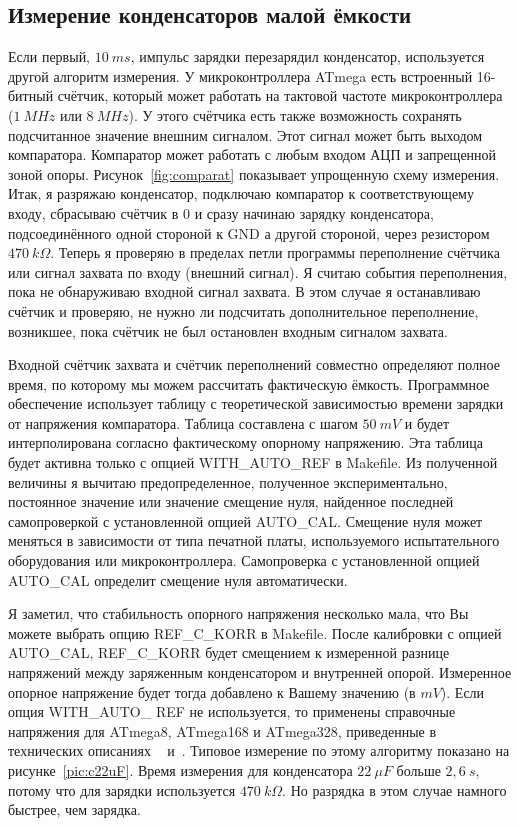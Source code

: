 \subsection{Измерение конденсаторов малой ёмкости}
Если первый, \(10~ms\), импульс зарядки перезарядил конденсатор, используется другой алгоритм измерения. У 
микроконтроллера ATmega есть встроенный 16-битный счётчик, который может работать на тактовой частоте 
микроконтроллера (\(1~MHz\) или \(8~MHz\)). У этого счётчика есть также возможность сохранять подсчитанное значение 
внешним сигналом. Этот сигнал может быть выходом компаратора. Компаратор может работать с любым входом АЦП и 
запрещенной зоной опоры. Рисунок~\ref{fig:comparat} показывает упрощенную схему измерения. Итак, я разряжаю 
конденсатор, подключаю компаратор к соответствующему входу, сбрасываю счётчик в 0 и сразу начинаю зарядку 
конденсатора, подсоединённого одной стороной к GND а другой стороной, через резистором \(470~k\Omega\). 
Теперь я проверяю в пределах петли программы переполнение счётчика или сигнал захвата по входу (внешний сигнал). 
Я считаю события переполнения, пока не обнаруживаю входной сигнал захвата. В этом случае я останавливаю счётчик 
и проверяю, не нужно ли подсчитать дополнительное переполнение,  возникшее, пока счётчик не был остановлен входным 
сигналом захвата. 


Входной счётчик захвата и счётчик переполнений совместно определяют полное время, по которому мы можем рассчитать 
фактическую ёмкость. Программное обеспечение использует таблицу с теоретической зависимостью времени зарядки от 
напряжения компаратора. Таблица составлена с шагом \(50~mV\) и будет интерполирована согласно фактическому опорному 
напряжению. Эта таблица будет активна только с опцией WITH\_AUTO\_REF в Makefile. Из полученной величины я вычитаю 
предопределенное, полученное экспериментально, постоянное значение или значение смещение нуля, найденное последней 
самопроверкой с установленной опцией AUTO\_CAL. Смещение нуля может меняться в зависимости от типа печатной платы, 
используемого испытательного оборудования или микроконтроллера. Самопроверка с установленной опцией AUTO\_CAL 
определит смещение нуля автоматически.

 
Я заметил, что стабильность опорного напряжения несколько мала, что Вы можете выбрать опцию REF\_C\_KORR в Makefile. 
После калибровки с опцией AUTO\_CAL, REF\_C\_KORR будет смещением к измеренной разнице напряжений между заряженным 
конденсатором и внутренней опорой. Измеренное опорное напряжение будет тогда добавлено к Вашему значению (в \(mV\)). 
Если опция WITH\_AUTO\_ REF не используется, то применены справочные напряжения для ATmega8, ATmega168 и ATmega328, 
приведенные в технических описаниях ~\cite{ATmega8} и~\cite{ATmega168}. 
Типовое измерение по этому алгоритму показано на рисунке~\ref{pic:c22uF}.
Время измерения для конденсатора \(22~\mu F\) больше \(2,6~s\), потому что для зарядки используется \(470~k\Omega\). 
Но разрядка в этом случае намного быстрее, чем зарядка.

